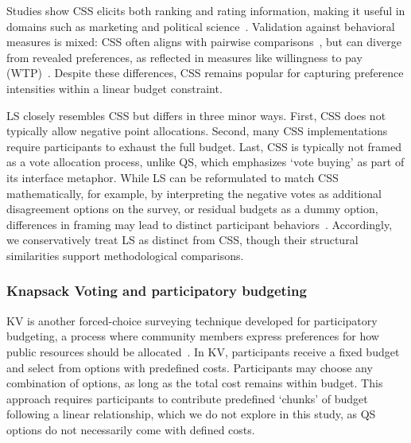 Studies show CSS elicits both ranking and rating information, making it useful in domains such as marketing and political science~\cite{collewet2023preference}. Validation against behavioral measures is mixed: CSS often aligns with pairwise comparisons~\cite{dudekValidityPointAssignmentProcedure1957}, but can diverge from revealed preferences, as reflected in measures like willingness to pay (WTP)~\cite{louviereComparisonImportanceWeights2008}. Despite these differences, CSS remains popular for capturing preference intensities within a linear budget constraint.

LS closely resembles CSS but differs in three minor ways. First, CSS does not typically allow negative point allocations. Second, many CSS implementations require participants to exhaust the full budget. Last, CSS is typically not framed as a vote allocation process, unlike QS, which emphasizes `vote buying' as part of its interface metaphor. While LS can be reformulated to match CSS mathematically, for example, by interpreting the negative votes as additional disagreement options on the survey, or residual budgets as a dummy option, differences in framing may lead to distinct participant behaviors~\cite{shahScarcityFramesValue2015, kahnemanProspectTheoryAnalysis1979}. Accordingly, we conservatively treat LS as distinct from CSS, though their structural similarities support methodological comparisons.

\subsubsection{Knapsack Voting and participatory budgeting}
KV is another forced-choice surveying technique developed for participatory budgeting, a process where community members express preferences for how public resources should be allocated~\cite{goelKnapsackVotingParticipatory2019, goel2016budget}. In KV, participants receive a fixed budget and select from options with predefined costs. Participants may choose any combination of options, as long as the total cost remains within budget. This approach requires participants to contribute predefined `chunks' of budget following a linear relationship, which we do not explore in this study, as QS options do not necessarily come with defined costs.

